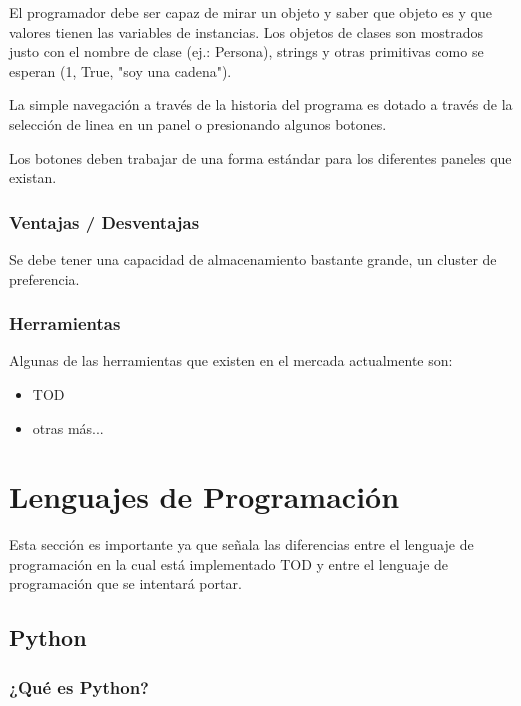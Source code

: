 \documentclass[12pt,a4paper]{report}
\begin{document}
\begin{itemize}
El programador debe ser capaz de mirar un objeto y saber que objeto es y que valores tienen las variables de instancias.  Los objetos de clases son mostrados justo con el nombre de clase (ej.: Persona), strings y otras primitivas como se esperan (1, True, "soy una cadena").


La simple navegación a través de la historia del programa es dotado a través de la selección de linea en un panel o presionando algunos botones.

Los botones deben trabajar de una forma estándar para los diferentes paneles que existan.


			\subsubsection{Ventajas / Desventajas}

Se debe tener una capacidad de almacenamiento bastante grande, un cluster de preferencia.

			\subsubsection{Herramientas}

Algunas de las herramientas que existen en el mercada actualmente son:
\begin{itemize}
	\item TOD
	\item otras más...
\end{itemize}



	\section{Lenguajes de Programación}

Esta sección es importante ya que señala las diferencias entre el lenguaje de programación en la cual está implementado TOD y entre el lenguaje de programación que se intentará portar.

		\subsection{Python}

			\subsubsection{¿Qué es Python?}


\end{itemize}
\end{document}
